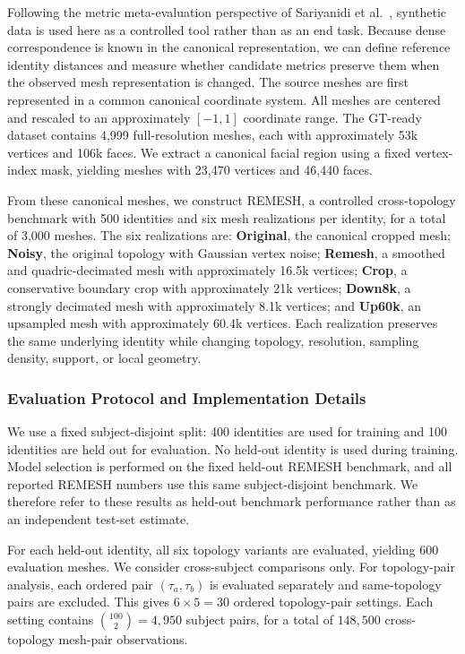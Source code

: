 Following the metric meta-evaluation perspective of
Sariyanidi et al.~\cite{10448898}, synthetic data is used here as a controlled tool rather than as an end task. Because dense correspondence is known in the canonical representation, we can define reference identity distances and measure whether candidate metrics preserve them when the observed mesh representation is changed. The source meshes are first represented in a common canonical coordinate system. All meshes are centered and rescaled to an approximately $[-1,1]$ coordinate range. The GT-ready dataset contains 4,999 full-resolution meshes, each with approximately 53k vertices and 106k faces. We extract a canonical facial region using a fixed vertex-index mask, yielding meshes with 23,470 vertices and 46,440 faces.

From these canonical meshes, we construct REMESH, a controlled cross-topology benchmark with 500 identities and six mesh realizations per identity, for a total of 3,000 meshes. The six realizations are: \textbf{Original}, the canonical cropped mesh;
\textbf{Noisy}, the original topology with Gaussian vertex noise; 
\textbf{Remesh}, a smoothed and quadric-decimated mesh with approximately 16.5k vertices;
\textbf{Crop}, a conservative boundary crop with approximately 21k vertices;
\textbf{Down8k}, a strongly decimated mesh with approximately 8.1k vertices; and
\textbf{Up60k}, an upsampled mesh with approximately 60.4k vertices.
Each realization preserves the same underlying identity while changing topology, resolution, sampling density, support, or local geometry.

\subsubsection{Evaluation Protocol and Implementation Details}
\label{sec:evaluation_protocol}
We use a fixed subject-disjoint split: 400 identities are used for training and 100 identities are held out for evaluation. No held-out identity is used during training. Model selection is performed on the fixed held-out REMESH benchmark, and all reported REMESH numbers use this same subject-disjoint benchmark. We therefore refer to these results as held-out benchmark performance rather than as an independent test-set estimate.

For each held-out identity, all six topology variants are evaluated, yielding 600 evaluation meshes. We consider cross-subject comparisons only. For topology-pair analysis, each ordered pair $(\tau_a,\tau_b)$ is evaluated separately and same-topology pairs are excluded. This gives $6\times5=30$ ordered topology-pair settings. Each setting contains $\binom{100}{2}=4{,}950$ subject pairs, for a total of $148{,}500$ cross-topology mesh-pair observations.

